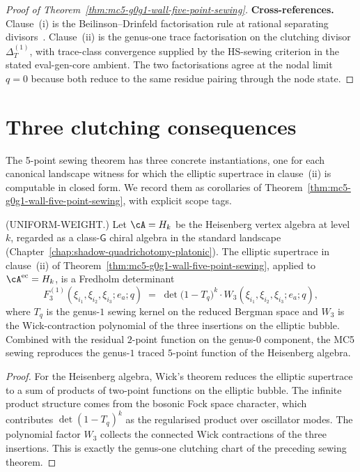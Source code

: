 \begin{proof}[Proof of Theorem~\ref{thm:mc5-g0g1-wall-five-point-sewing}]
\medskip
\textbf{Cross-references.}
Clause~\textup{(i)} is the Beilinson--Drinfeld factorisation rule at
rational separating divisors~\cite{BeilinsonDrinfeld04}. Clause~\textup{(ii)}
is the genus-one trace factorisation on the clutching divisor
$\Delta^{(1)}_T$, with trace-class convergence supplied by the
HS-sewing criterion in the stated eval-gen-core ambient. The two
factorisations agree at the nodal limit $q=0$ because both reduce to the
same residue pairing through the node state.
\end{proof}

\section{Three clutching consequences}
\label{sec:mc5-g0g1-three-consequences}

The 5-point sewing theorem has three concrete instantiations, one for
each canonical landscape witness for which the elliptic supertrace in
clause~\textup{(ii)} is computable in closed form. We record them as
corollaries of
Theorem~\ref{thm:mc5-g0g1-wall-five-point-sewing}, with explicit scope
tags.

\begin{corollary}
\label{cor:mc5-g0g1-heisenberg-elliptic-function}
\textup{(UNIFORM-WEIGHT.)}
Let $\cA = H_{k}$ be the Heisenberg vertex algebra at level $k$, regarded
as a class-$\mathsf{G}$ chiral algebra in the standard landscape
\textup{(}Chapter~\ref{chap:shadow-quadrichotomy-platonic}\textup{)}. The
elliptic supertrace in clause~\textup{(ii)} of
Theorem~\ref{thm:mc5-g0g1-wall-five-point-sewing}, applied to
$\cA^{\evcore} = H_{k}$, is a Fredholm determinant
\begin{equation}
\label{eq:mc5-g0g1-heisenberg-fredholm-determinant}
F^{(1)}_{3}(\xi_{i_{1}}, \xi_{i_{2}}, \xi_{i_{3}}; e_{a}; q)
\;=\;
\det\bigl(1 - T_{q}\bigr)^{k} \cdot W_{3}(\xi_{i_{1}}, \xi_{i_{2}}, \xi_{i_{3}}; e_{a}; q),
\end{equation}
where $T_{q}$ is the genus-$1$ sewing kernel on the reduced Bergman
space and $W_{3}$ is the Wick-contraction polynomial of the three
insertions on the elliptic bubble. Combined with the residual $2$-point
function on the genus-$0$ component, the MC5 sewing reproduces the
genus-$1$ traced $5$-point function of the Heisenberg algebra.
\end{corollary}

\begin{proof}
For the Heisenberg algebra, Wick's theorem reduces the elliptic supertrace
to a sum of products of two-point functions on the elliptic bubble. The
infinite product structure comes from the bosonic Fock space character,
which contributes $\det(1 - T_{q})^{k}$ as the regularised product over
oscillator modes. The polynomial factor $W_{3}$ collects the connected
Wick contractions of the three insertions. This is exactly the
genus-one clutching chart of the preceding sewing theorem.
\end{proof}

